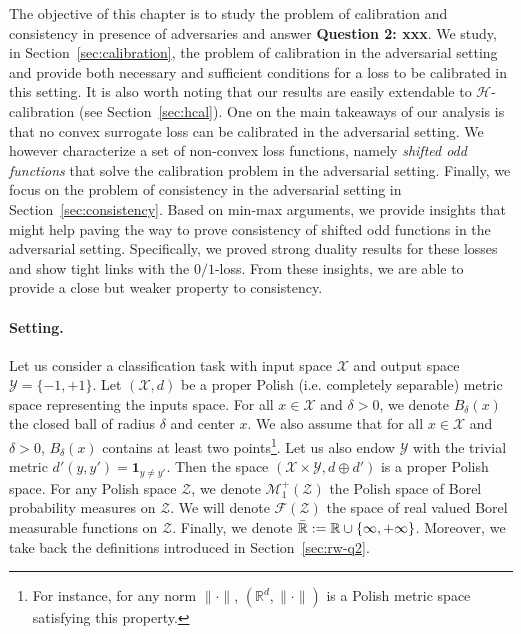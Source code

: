 




The objective of this chapter is to study the problem of calibration and consistency in presence of adversaries and answer \textbf{Question 2: xxx}. We study, in Section~\ref{sec:calibration}, the problem of calibration in the adversarial setting and provide both necessary and sufficient conditions for a loss to be calibrated in this setting. It is also worth noting that our results are easily extendable to  $\mathcal{H}$-calibration (see Section~\ref{sec:hcal}). One on the main takeaways of our analysis is that  no convex surrogate loss can be calibrated in the adversarial setting. We however characterize a set of non-convex loss functions, namely \emph{shifted odd functions} that solve the calibration problem in the adversarial setting. Finally, we focus on the problem of consistency in the adversarial setting in Section~\ref{sec:consistency}. Based on min-max arguments, we provide insights that might help paving the way to prove consistency of shifted odd functions in the adversarial setting. Specifically, we proved strong duality results for these losses and show tight links with the $0/1$-loss. From these insights, we are able to provide a close but weaker property to consistency.

\paragraph{Setting.} Let us consider a classification task with input space $\mathcal{X}$ and output space $\mathcal{Y}=\{-1,+1\}$. Let $(\mathcal{X},d)$ be a proper Polish (i.e. completely separable) metric space representing the inputs space. For all $x\in\mathcal{X}$ and $\delta>0$, we denote $B_\delta(x)$ the closed ball of radius $\delta$ and center $x$. We also assume that for all $x\in\mathcal{X}$ and $\delta>0$,  $B_\delta(x)$ contains at least two points\footnote{For instance, for any norm $\lVert\cdot\rVert$,  $(\mathbb{R}^d,\lVert \cdot \rVert)$ is a Polish metric space satisfying this property.}. Let us also endow $\mathcal{Y}$ with the trivial metric  $d'(y,y') = \mathbf{1}_{y\neq y'}$. Then the space $(\mathcal{X}\times\mathcal{Y},d\oplus d')$ is a proper Polish space. For any Polish space $\mathcal{Z}$, we denote $\mathcal{M}^+_1(\mathcal{Z})$ the Polish space of Borel probability measures on $\mathcal{Z}$. We will denote $\mathcal{F}(\mathcal{Z})$ the space of real valued Borel measurable functions on $\mathcal{Z}$. Finally, we denote $\bar{\mathbb{R}}:=\mathbb{R}\cup\{\-\infty,+\infty\}$. Moreover, we take back the definitions introduced in Section~\ref{sec:rw-q2}.








